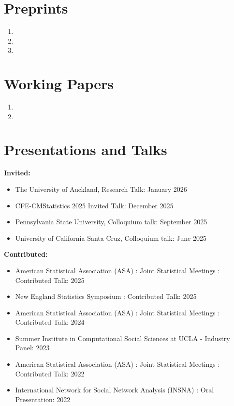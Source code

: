 \documentclass[letterpaper,11pt]{article}
\newcommand{\resumeItemNotBold}[2]{
  \item\small{{#1}{: #2 \vspace{-2pt}}}
}
\newcommand{\resumeSubItemNotBold}[2]{\resumeItemNotBold{#1}{#2}\vspace{-4pt}}
\newcommand{\resumeSubHeadingListStartNoBullet}{\begin{itemize}[leftmargin=*,label={}]}
\newcommand{\resumeSubHeadingListEnd}{\end{itemize}}
\begin{document}
\section{Preprints}
  \begin{enumerate}[label=\arabic*., leftmargin=*, itemsep=0pt]
    \item {}
    \item {}
    \item {}
    \end{enumerate}

\section{Working Papers}
  \begin{enumerate}[label=\arabic*., leftmargin=*, itemsep=0pt]
    \item {}
    \item {}
    \end{enumerate}

 \section{Presentations and Talks}
 \textbf{Invited:}
   \resumeSubHeadingListStartNoBullet
         \resumeSubItemNotBold
        {The University of Auckland, Research Talk}{January 2026}
                 \resumeSubItemNotBold
        {CFE-CMStatistics 2025 Invited Talk}{December 2025}
      \resumeSubItemNotBold
        {Pennsylvania State University, Colloquium talk}{September 2025}
     \resumeSubItemNotBold
        {University of California Santa Cruz, Colloquium talk}{June 2025}
        \resumeSubHeadingListEnd
 \textbf{Contributed:}
  \resumeSubHeadingListStartNoBullet
     \resumeSubItemNotBold
        {American Statistical Association (ASA) : Joint Statistical Meetings : Contributed Talk}{2025}
    \resumeSubItemNotBold
        {New England Statistics Symposium : Contributed Talk}{2025}
     \resumeSubItemNotBold
        {American Statistical Association (ASA) : Joint Statistical Meetings : Contributed Talk}{2024}
    \resumeSubItemNotBold
        {Summer Institute in Computational Social Sciences at UCLA - Industry Panel}{2023}
     \resumeSubItemNotBold
        {American Statistical Association (ASA) : Joint Statistical Meetings : Contributed Talk}{2022}
    \resumeSubItemNotBold
        {International Network for Social Network Analysis (INSNA) : Oral Presentation}{2022}
  \resumeSubHeadingListEnd
\end{document}
